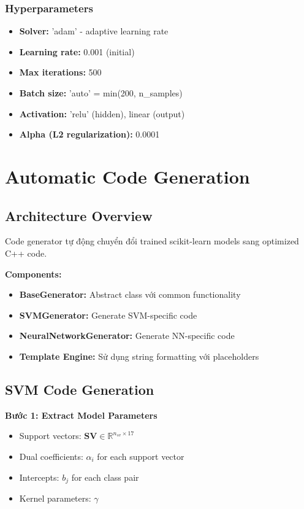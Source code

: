 \subsubsection{Hyperparameters}
\begin{itemize}
    \item \textbf{Solver:} 'adam' - adaptive learning rate
    \item \textbf{Learning rate:} 0.001 (initial)
    \item \textbf{Max iterations:} 500
    \item \textbf{Batch size:} 'auto' = min(200, n\_samples)
    \item \textbf{Activation:} 'relu' (hidden), linear (output)
    \item \textbf{Alpha (L2 regularization):} 0.0001
\end{itemize}

\section{Automatic Code Generation}
\label{sec:code-generation}

\subsection{Architecture Overview}
Code generator tự động chuyển đổi trained scikit-learn models sang optimized C++ code.

\textbf{Components:}
\begin{itemize}
    \item \textbf{BaseGenerator:} Abstract class với common functionality
    \item \textbf{SVMGenerator:} Generate SVM-specific code
    \item \textbf{NeuralNetworkGenerator:} Generate NN-specific code
    \item \textbf{Template Engine:} Sử dụng string formatting với placeholders
\end{itemize}

\subsection{SVM Code Generation}

\textbf{Bước 1: Extract Model Parameters}
\begin{itemize}
    \item Support vectors: $\mathbf{SV} \in \mathbb{R}^{n_{sv} \times 17}$
    \item Dual coefficients: $\alpha_i$ for each support vector
    \item Intercepts: $b_j$ for each class pair
    \item Kernel parameters: $\gamma$
\end{itemize}

